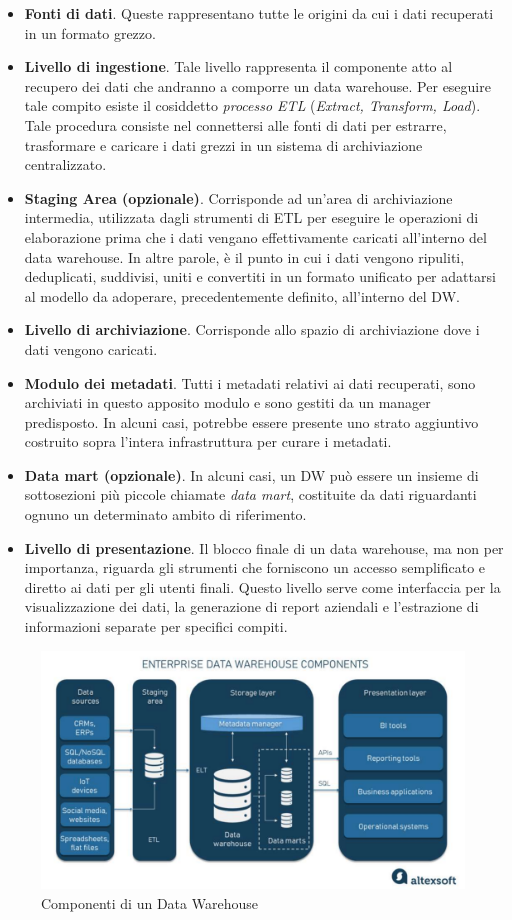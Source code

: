 \begin{itemize}
    \item \textbf{Fonti di dati}. Queste rappresentano tutte le origini da cui i dati recuperati in un formato grezzo.
    \item \textbf{Livello di ingestione}. Tale livello rappresenta il componente atto al recupero dei dati che andranno a comporre un data warehouse. Per eseguire tale compito esiste il cosiddetto \textit{processo ETL} (\textit{Extract, Transform, Load}). Tale procedura consiste nel connettersi alle fonti di dati per estrarre, trasformare e caricare i dati grezzi in un sistema di archiviazione centralizzato.
    \item \textbf{Staging Area (opzionale)}. Corrisponde ad un'area di archiviazione intermedia, utilizzata dagli strumenti di ETL per eseguire le operazioni di elaborazione prima che i dati vengano effettivamente caricati all'interno del data warehouse. In altre parole, è il punto in cui i dati vengono ripuliti, deduplicati, suddivisi, uniti e convertiti in un formato unificato per adattarsi al modello da adoperare, precedentemente definito, all'interno del DW. 
    \item \textbf{Livello di archiviazione}. Corrisponde allo spazio di archiviazione dove i dati vengono caricati.
    \item \textbf{Modulo dei metadati}. Tutti i metadati relativi ai dati recuperati, sono archiviati in questo apposito modulo e sono gestiti da un manager predisposto. In alcuni casi, potrebbe essere presente uno strato aggiuntivo costruito sopra l'intera infrastruttura per curare i metadati. 
    \item \textbf{Data mart (opzionale)}. In alcuni casi, un DW può essere un insieme di sottosezioni più piccole chiamate \textit{data mart}, costituite da dati riguardanti ognuno un determinato ambito di riferimento.
    \item \textbf{Livello di presentazione}. Il blocco finale di un data warehouse, ma non per importanza, riguarda gli strumenti che forniscono un accesso semplificato e diretto ai dati per gli utenti finali. Questo livello serve come interfaccia per la visualizzazione dei dati, la generazione di report aziendali e l'estrazione di informazioni separate per specifici compiti.
\end{itemize}

\begin{figure}[H]
    \centering
    \includegraphics[width=0.7\linewidth]{figure/capitolo_2/Data Warehouse Components.pdf}
    \caption{Componenti di un Data Warehouse}
    \label{fig:Data Warehouse Components}
\end{figure}

